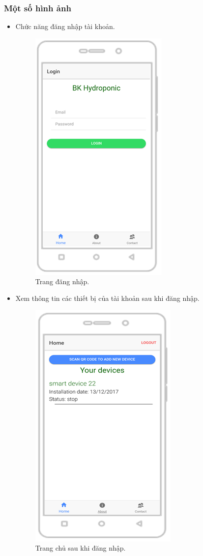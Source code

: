 \documentclass[a4paper,12pt,oneside]{article}
\begin{document}
\subsubsection{Một số hình ảnh}
\begin{itemize}
\item Chức năng đăng nhập tài khoản.
\begin{figure}[H]
\centering
\includegraphics[scale=1]{hinh/mobile_login.png}
\caption{Trang đăng nhập.}
\end{figure}

\newpage
\item Xem thông tin các thiết bị của tài khoản sau khi đăng nhập.
\begin{figure}[H]
\centering
\includegraphics[scale=1]{hinh/mobile_home.png}
\caption{Trang chủ sau khi đăng nhập.}
\end{figure}


\end{itemize}
\end{document}
